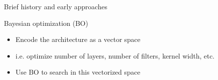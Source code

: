 \begin{frame}[c]{Brief history and early approaches}
\pause
\begin{itemize}
\footnotesize{
	\item \alert{Bayesian optimization (BO)}
	\begin{itemize}
		\item Encode the architecture as a vector space
		\item i.e. optimize number of layers, number of filters, kernel width, etc.
		\item Use BO to search in this vectorized space 
	\end{itemize}
}
\end{itemize}
\end{frame}

